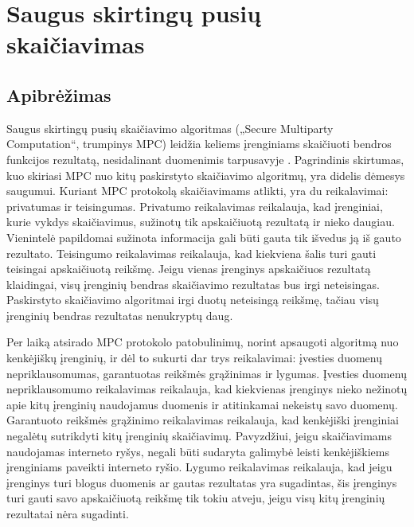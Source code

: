 \documentclass{VUMIFInfBakalaurinis}
\begin{document}
\section{Saugus skirtingų pusių skaičiavimas}
\subsection{Apibrėžimas}
\par Saugus skirtingų pusių skaičiavimo algoritmas („Secure Multiparty Computation“, trumpinys MPC) leidžia keliems įrenginiams skaičiuoti bendros funkcijos rezultatą, nesidalinant duomenimis tarpusavyje \cite{22}. Pagrindinis skirtumas, kuo  skiriasi MPC nuo kitų paskirstyto skaičiavimo algoritmų, yra didelis dėmesys saugumui. Kuriant MPC protokolą skaičiavimams atlikti, yra du reikalavimai: privatumas ir teisingumas. Privatumo reikalavimas reikalauja, kad įrenginiai, kurie vykdys skaičiavimus, sužinotų tik apskaičiuotą rezultatą ir nieko daugiau. Vienintelė papildomai sužinota informacija gali būti gauta tik išvedus ją iš gauto rezultato. Teisingumo reikalavimas reikalauja, kad kiekviena šalis turi gauti teisingai apskaičiuotą reikšmę. Jeigu vienas įrenginys apskaičiuos rezultatą klaidingai, visų įrenginių bendras skaičiavimo rezultatas bus irgi neteisingas. Paskirstyto skaičiavimo algoritmai irgi duotų neteisingą reikšmę, tačiau visų įrenginių bendras rezultatas nenukryptų daug.
\par Per laiką atsirado MPC protokolo patobulinimų, norint apsaugoti algoritmą nuo kenkėjiškų įrenginių, ir dėl to sukurti dar trys reikalavimai: įvesties duomenų nepriklausomumas, garantuotas reikšmės grąžinimas ir lygumas. Įvesties duomenų nepriklausomumo reikalavimas reikalauja, kad kiekvienas įrenginys nieko nežinotų apie kitų įrenginių naudojamus duomenis ir atitinkamai nekeistų savo duomenų. Garantuoto reikšmės grąžinimo reikalavimas reikalauja, kad kenkėjiški įrenginiai negalėtų sutrikdyti kitų įrenginių skaičiavimų. Pavyzdžiui, jeigu skaičiavimams naudojamas interneto ryšys, negali būti sudaryta galimybė leisti kenkėjiškiems įrenginiams paveikti interneto ryšio. Lygumo reikalavimas reikalauja, kad jeigu įrenginys turi blogus duomenis ar gautas rezultatas yra sugadintas, šis įrenginys turi gauti savo apskaičiuotą reikšmę tik tokiu atveju, jeigu visų kitų įrenginių rezultatai nėra sugadinti.
\end{document}

